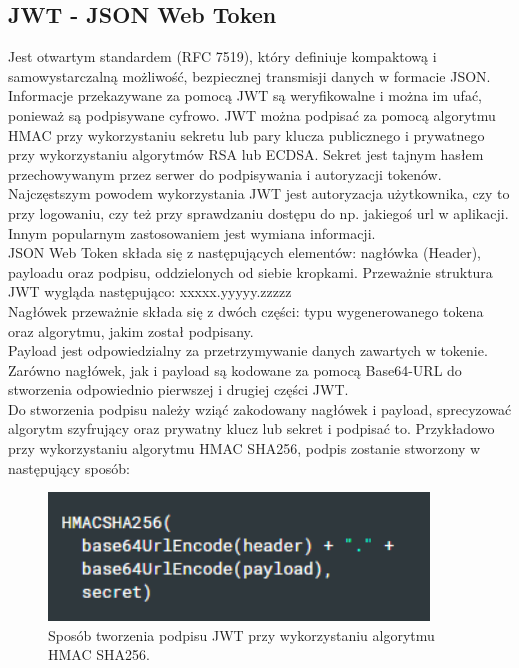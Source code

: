 \documentclass[12pt]{article}
\begin{document}
\begin{sloppypar}
{  \subsection{JWT - JSON Web Token}
  {
    Jest otwartym standardem (RFC 7519), który definiuje kompaktową i samowystarczalną możliwość, bezpiecznej transmisji danych w formacie JSON\cite{jwt}. 
    Informacje przekazywane za pomocą JWT są weryfikowalne i można im ufać, ponieważ są podpisywane cyfrowo. 
    JWT można podpisać za pomocą algorytmu HMAC przy wykorzystaniu sekretu lub pary klucza publicznego i prywatnego przy wykorzystaniu algorytmów RSA lub ECDSA. 
    Sekret jest tajnym hasłem przechowywanym przez serwer do podpisywania i autoryzacji tokenów.
    Najczęstszym powodem wykorzystania JWT jest autoryzacja użytkownika, czy to przy logowaniu, czy też 
    przy sprawdzaniu dostępu do np. jakiegoś url w aplikacji. Innym popularnym zastosowaniem jest wymiana informacji.\\
    JSON Web Token składa się z następujących elementów: nagłówka (Header), payloadu oraz podpisu, oddzielonych od siebie kropkami. 
    Przeważnie struktura JWT wygląda następująco: xxxxx.yyyyy.zzzzz\\
    Nagłówek przeważnie składa się z dwóch części: typu wygenerowanego tokena oraz algorytmu, jakim został podpisany.\\
    Payload jest odpowiedzialny za przetrzymywanie danych zawartych w tokenie.\\
    Zarówno nagłówek, jak i payload są kodowane za pomocą Base64-URL do stworzenia odpowiednio pierwszej i drugiej części JWT.\\
    Do stworzenia podpisu należy wziąć zakodowany nagłówek i payload, sprecyzować algorytm szyfrujący oraz prywatny klucz lub sekret i podpisać to.
    Przykładowo przy wykorzystaniu algorytmu HMAC SHA256, podpis zostanie stworzony w następujący sposób:\\
    \begin{figure}[H]
      \centering
      \includegraphics[width=0.9\textwidth]{JWT_signature.PNG}
      \caption{Sposób tworzenia podpisu JWT przy wykorzystaniu algorytmu HMAC SHA256.}

\end{figure}}}
\end{sloppypar}
\end{document}
